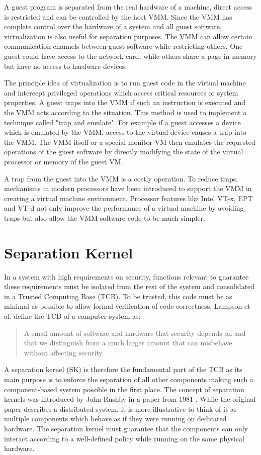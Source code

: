 A guest program is separated from the real hardware of a machine, direct access
is restricted and can be controlled by the host VMM. Since the VMM has complete
control over the hardware of a system and all guest software, virtualization is
also useful for separation purposes. The VMM can allow certain communication
channels between guest software while restricting others. One guest could have
access to the network card, while others share a page in memory but have no
access to hardware devices.

The principle idea of virtualization is to run guest code in the virtual machine
and intercept privileged operations which access critical resources or system
properties. A guest traps into the VMM if such an instruction is executed and
the VMM acts according to the situation. This method is used to implement a
technique called "trap and emulate". For example if a guest accesses a device
which is emulated by the VMM, access to the virtual device causes a trap into
the VMM. The VMM itself or a special monitor VM then emulates the requested
operations of the guest software by directly modifying the state of the virtual
processor or memory of the guest VM.

A trap from the guest into the VMM is a costly operation. To reduce traps,
mechanisms in modern processors have been introduced to support the VMM in
creating a virtual machine environment. Processor features like Intel VT-x, EPT
and VT-d not only improve the performance of a virtual machine by avoiding traps
but also allow the VMM software code to be much simpler.

\section{Separation Kernel}
In a system with high requirements on security, functions relevant
to guarantee these requirements must be isolated from the rest of
the system and consolidated in a Trusted Computing Base (TCB).
To be trusted, this code must be as minimal as possible to allow formal
verification of code correctness. Lampson et al.
\cite{Lampson:1991:ADS:121133.121160} define the TCB of a computer system as:
\begin{quote}
	A small amount of software and hardware that security depends on and
	that we distinguish from a much larger amount that can misbehave without
	affecting security.
\end{quote}

A separation kernel (SK) is therefore the fundamental
part of the TCB as its main purpose is to enforce the separation of all other
components making such a component-based system possible in the first place. The
concept of separation kernels was introduced by John Rushby in a paper from 1981
\cite{rushby1981}. While the original paper describes a distributed system, it
is more illustrative to think of it as multiple components which behave as if
they were running on dedicated hardware. The separation kernel must guarantee
that the components can only interact according to a well-defined policy while
running on the same physical hardware.

